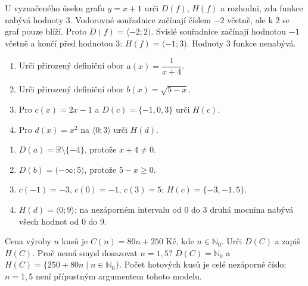 \documentclass[11pt,a4paper]{article}
\begin{document}
\begin{prikladReseniBox}[title={Příklad 5}]
U vyznačeného úseku grafu $y=x+1$ urči $D(f)$, $H(f)$ a rozhodni,
zda funkce nabývá hodnoty $3$.
\tcblower
Vodorovné souřadnice začínají číslem $-2$ včetně, ale k $2$ se
graf pouze blíží. Proto $D(f)=\langle-2;2)$. Svislé souřadnice
začínají hodnotou $-1$ včetně a končí před hodnotou $3$:
$H(f)=\langle-1;3)$. Hodnoty $3$ funkce nenabývá.
\end{prikladReseniBox}


\begin{zadaniReseniBox}[title={Samostatná práce 1}]
\begin{enumerate}[label=\alph*)]
\item Urči přirozený definiční obor $a(x)=\dfrac{1}{x+4}$.
\item Urči přirozený definiční obor $b(x)=\sqrt{5-x}$.
\item Pro $c(x)=2x-1$ a $D(c)=\{-1,0,3\}$ urči $H(c)$.
\item Pro $d(x)=x^2$ na $\langle0;3\rangle$ urči $H(d)$.
\end{enumerate}
\tcblower
\begin{enumerate}[label=\alph*)]
\item $D(a)=\mathbb R\setminus\{-4\}$, protože $x+4\ne0$.
\item $D(b)=(-\infty;5\rangle$, protože $5-x\ge0$.
\item $c(-1)=-3$, $c(0)=-1$, $c(3)=5$; $H(c)=\{-3,-1,5\}$.
\item $H(d)=\langle0;9\rangle$: na nezáporném intervalu
od $0$ do $3$ druhá mocnina nabývá všech hodnot od $0$ do $9$.
\end{enumerate}
\end{zadaniReseniBox}

\begin{zadaniReseniBox}[title={Rozšíření 1}]
Cena výroby $n$ kusů je $C(n)=80n+250$ Kč, kde $n\in\mathbb N_0$.
Urči $D(C)$ a zapiš $H(C)$. Proč nemá smysl dosazovat $n=1{,}5$?
\tcblower
$D(C)=\mathbb N_0$ a $H(C)=\{250+80n\mid n\in\mathbb N_0\}$.
Počet hotových kusů je celé nezáporné číslo; $n=1{,}5$
není přípustným argumentem tohoto modelu.
\end{zadaniReseniBox}
\end{document}
